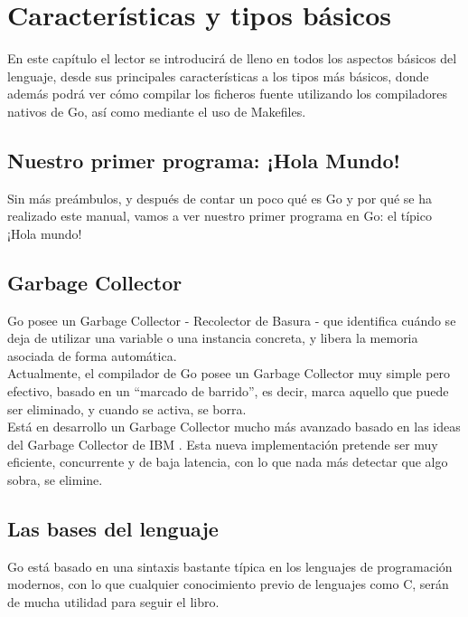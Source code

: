 \chapter{Características y tipos básicos}

En este capítulo el lector se introducirá de lleno en todos los aspectos básicos
del lenguaje, desde sus principales características a los tipos más básicos,
donde además podrá ver cómo compilar los ficheros fuente utilizando los
compiladores nativos de Go, así como mediante el uso de Makefiles.

\section{Nuestro primer programa: ¡Hola Mundo!}

Sin más preámbulos, y después de contar un poco qué es Go y por qué se ha
realizado este manual, vamos a ver nuestro primer programa en Go: el típico
¡Hola mundo!


\section{Garbage Collector\label{Garbage Collector}}

Go posee un Garbage Collector - Recolector de Basura - que identifica cuándo se
deja de utilizar una variable o una instancia concreta, y libera la memoria
asociada de forma automática.\\

Actualmente, el compilador de Go posee un Garbage Collector muy simple pero
efectivo, basado en un ``marcado de barrido'', es decir, marca aquello que puede
ser eliminado, y cuando se activa, se borra.\\

Está en desarrollo un Garbage Collector mucho más avanzado basado en las ideas
del Garbage Collector de IBM\texttrademark
\cite{IBMGC}. Esta nueva
implementación pretende ser muy eficiente, concurrente y de baja latencia, con
lo que nada más detectar que algo sobra, se elimine.

\section{Las bases del lenguaje}

Go está basado en una sintaxis bastante típica en los lenguajes de programación
modernos, con lo que cualquier conocimiento previo de lenguajes como C, serán de
mucha utilidad para seguir el libro.\\

